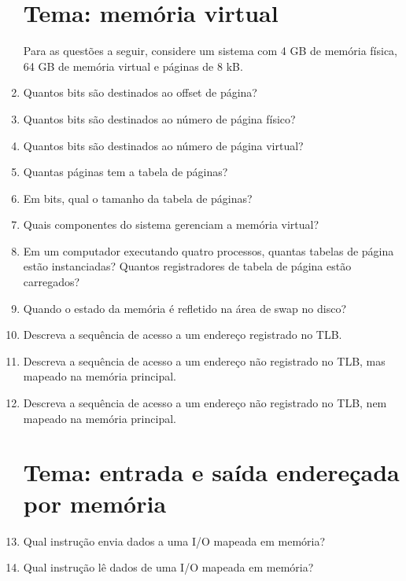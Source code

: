 \documentclass{article}
\begin{document}
\begin{enumerate}
\section*{Tema: memória virtual}

Para as questões a seguir, considere um sistema com 4 GB de memória física, 64 GB de memória virtual e páginas de 8 kB.

\item Quantos bits são destinados ao offset de página?

\item Quantos bits são destinados ao número de página físico?

\item Quantos bits são destinados ao número de página virtual?

\item Quantas páginas tem a tabela de páginas?

\item Em bits, qual o tamanho da tabela de páginas?

\item Quais componentes do sistema gerenciam a memória virtual?

\item Em um computador executando quatro processos, quantas tabelas de página estão instanciadas? Quantos registradores de tabela de página estão carregados?

\item Quando o estado da memória é refletido na área de swap no disco?

\item Descreva a sequência de acesso a um endereço registrado no TLB.

\item Descreva a sequência de acesso a um endereço não registrado no TLB, mas mapeado na memória principal.

\item Descreva a sequência de acesso a um endereço não registrado no TLB, nem mapeado na memória principal.

\section*{Tema: entrada e saída endereçada por memória}

\item Qual instrução envia dados a uma I/O mapeada em memória?

\item Qual instrução lê dados de uma I/O mapeada em memória?


\end{enumerate}
\end{document}
